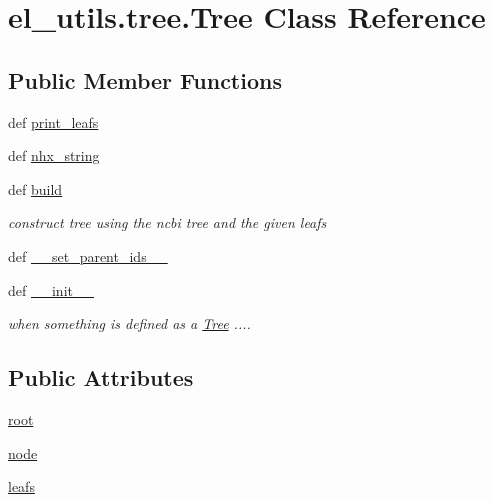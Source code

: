 \hypertarget{classel__utils_1_1tree_1_1Tree}{\section{el\-\_\-utils.\-tree.\-Tree Class Reference}
\label{classel__utils_1_1tree_1_1Tree}
}
\subsection*{Public Member Functions}
\begin{DoxyCompactItemize}
\item 
def \hyperlink{classel__utils_1_1tree_1_1Tree_ae5597f9564d23ca8e5e3e991f11a0161}{print\-\_\-leafs}
\item 
def \hyperlink{classel__utils_1_1tree_1_1Tree_a92aff50f46f10f880b53f017b1ecda42}{nhx\-\_\-string}
\item 
def \hyperlink{classel__utils_1_1tree_1_1Tree_a61d044ef8aa83a7e6bf3019fd75f0877}{build}
\begin{DoxyCompactList}\small\item\em construct tree using the ncbi tree and the given leafs \end{DoxyCompactList}\item 
def \hyperlink{classel__utils_1_1tree_1_1Tree_aa6a1e7dd4f1b30c2ad6483597eb76356}{\-\_\-\-\_\-set\-\_\-parent\-\_\-ids\-\_\-\-\_\-}
\item 
def \hyperlink{classel__utils_1_1tree_1_1Tree_a2f8ef0bffe1bc647863cc48039502c39}{\-\_\-\-\_\-init\-\_\-\-\_\-}
\begin{DoxyCompactList}\small\item\em when something is defined as a \hyperlink{classel__utils_1_1tree_1_1Tree}{Tree} .... \end{DoxyCompactList}\end{DoxyCompactItemize}
\subsection*{Public Attributes}
\begin{DoxyCompactItemize}
\item 
\hyperlink{classel__utils_1_1tree_1_1Tree_a222ab3605a681f26dd6f2555a3fdc6c3}{root}
\item 
\hyperlink{classel__utils_1_1tree_1_1Tree_a6c609fefe930e16e59a019ef2a831d56}{node}
\item 
\hyperlink{classel__utils_1_1tree_1_1Tree_adfd7ed5083190b935a3e409a4195f761}{leafs}
\end{DoxyCompactItemize}


